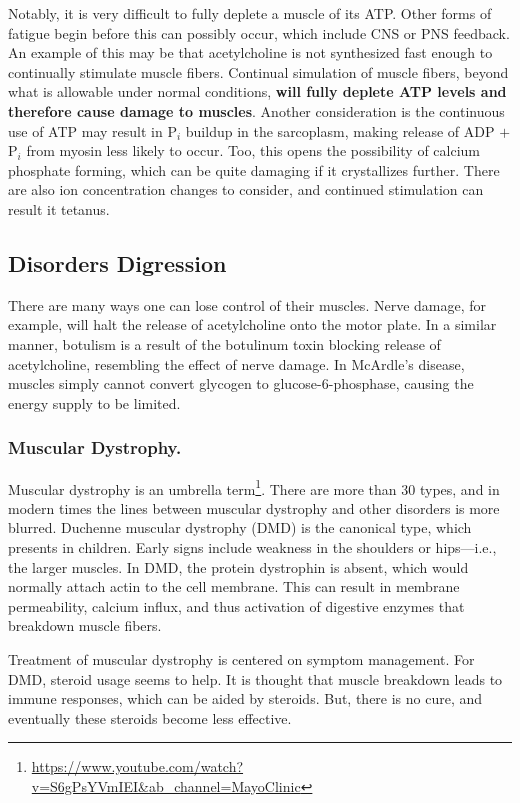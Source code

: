 \documentclass[12pt]{report}
\begin{document}
Notably, it is very difficult to fully deplete a muscle of its ATP. Other forms of fatigue begin before this can possibly occur, which include CNS or PNS feedback. An example of this may be that acetylcholine is not synthesized fast enough to continually stimulate muscle fibers. Continual simulation of muscle fibers, beyond what is allowable under normal conditions, \textbf{will fully deplete ATP levels and therefore cause damage to muscles}. Another consideration is the continuous use of ATP may result in P$_i$ buildup in the sarcoplasm, making release of ADP $+$ P$_i$ from myosin less likely to occur. Too, this opens the possibility of calcium phosphate forming, which can be quite damaging if it crystallizes further. There are also ion concentration changes to consider, and continued stimulation can result it tetanus.

\subsection{Disorders Digression}
There are many ways one can lose control of their muscles. Nerve damage, for example, will halt the release of acetylcholine onto the motor plate. In a similar manner, botulism is a result of the botulinum toxin blocking release of acetylcholine, resembling the effect of nerve damage. In McArdle's disease, muscles simply cannot convert glycogen to glucose-6-phosphase, causing the energy supply to be limited. 

\subsubsection{Muscular Dystrophy.}

Muscular dystrophy is an umbrella term\footnote{\url{https://www.youtube.com/watch?v=S6gPsYVmIEI\&ab_channel=MayoClinic}}. There are more than 30 types, and in modern times the lines between muscular dystrophy and other disorders is more blurred. Duchenne muscular dystrophy (DMD) is the canonical type, which presents in children. Early signs include weakness in the shoulders or hips---i.e., the larger muscles. In DMD, the protein dystrophin is absent, which would normally attach actin to the cell membrane. This can result in membrane permeability, calcium influx, and thus activation of digestive enzymes that breakdown muscle fibers.\newline

Treatment of muscular dystrophy is centered on symptom management. For DMD, steroid usage seems to help. It is thought that muscle breakdown leads to immune responses, which can be aided by steroids. But, there is no cure, and eventually these steroids become less effective. 
\end{document}
